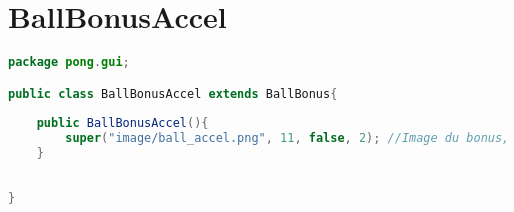 \section{BallBonusAccel}
\begin{lstlisting}[language=Java]
package pong.gui;

public class BallBonusAccel extends BallBonus{
	
	public BallBonusAccel(){
		super("image/ball_accel.png", 11, false, 2); //Image du bonus, frequence, malus, numBonus
	}
	
	
}
\end{lstlisting}